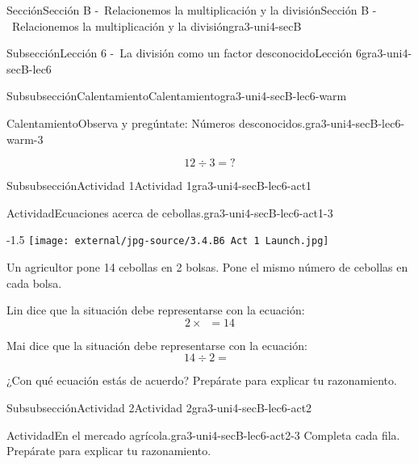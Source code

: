 \documentclass[twoside,14pt,]{extarticle}
\newcommand{\tabularfont}{\relax}
\begin{document}
\begin{sectionptx}{Sección}{Sección B -~Relacionemos la multiplicación y la división}{}{Sección B -~Relacionemos la multiplicación y la división}{}{}{gra3-uni4-secB}
\begin{subsectionptx}{Subsección}{Lección 6 -~La división como un factor desconocido}{}{Lección 6}{}{}{gra3-uni4-secB-lec6}
\begin{subsubsectionptx}{Subsubsección}{Calentamiento}{}{Calentamiento}{}{}{gra3-uni4-secB-lec6-warm}
\begin{exploration}{Calentamiento}{Observa y pregúntate: Números desconocidos.}{gra3-uni4-secB-lec6-warm-3}
\begin{sidebyside}{2}{0}{0}{0}
\begin{sbspanel}{0.5}
%
\end{sbspanel}%
\begin{sbspanel}{0.5}%
\par
%
\begin{equation*}
12\div 3 ={?}
\end{equation*}
%
\end{sbspanel}%
\end{sidebyside}%
\end{exploration}%
\end{subsubsectionptx}
%
%
\typeout{************************************************}
\typeout{************************************************}
%
\begin{subsubsectionptx}{Subsubsección}{Actividad 1}{}{Actividad 1}{}{}{gra3-uni4-secB-lec6-act1}
\begin{activity}{Actividad}{Ecuaciones acerca de cebollas.}{gra3-uni4-secB-lec6-act1-3}%
\begin{image}{0.15}{0.7}{0.15}{-1.5\baselineskip}%
\texttt{[image: external/jpg-source/3.4.B6 Act 1 Launch.jpg]}
\end{image}%
Un agricultor pone 14 cebollas en 2 bolsas. Pone el mismo número de cebollas en cada bolsa.%
\par
Lin dice que la situación debe representarse con la ecuación:%
\begin{equation*}
2 \times \boxed{\phantom{3}} = 14
\end{equation*}
%
\par
Mai dice que la situación debe representarse con la ecuación:%
\begin{equation*}
14 \div 2 = \boxed{\phantom{3}}
\end{equation*}
%
\par
¿Con qué ecuación estás de acuerdo? Prepárate para explicar tu razonamiento.%
\end{activity}%
\end{subsubsectionptx}
%
%
\typeout{************************************************}
\typeout{************************************************}
%
\begin{subsubsectionptx}{Subsubsección}{Actividad 2}{}{Actividad 2}{}{}{gra3-uni4-secB-lec6-act2}
\begin{activity}{Actividad}{En el mercado agrícola.}{gra3-uni4-secB-lec6-act2-3}%
Completa cada fila. Prepárate para explicar tu razonamiento.%
\begin{center}%
{\tabularfont%
}
\end{center}
\end{activity}
\end{subsubsectionptx}
\end{subsectionptx}
\end{sectionptx}
\end{document}
